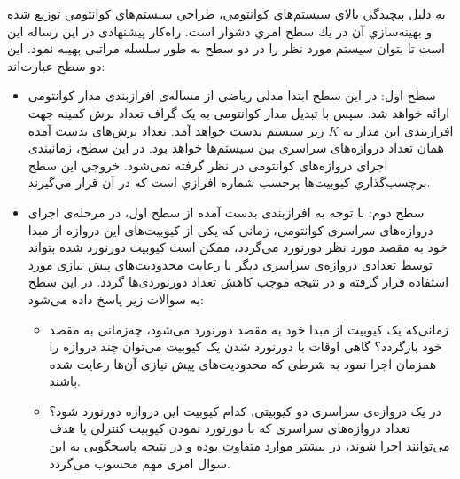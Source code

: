 به دليل پيچيدگي بالاي سيستم‌هاي كوانتومي، طراحي سيستم‌هاي كوانتومي توزيع شده و بهينه‌سازي آن در يك سطح امري دشوار است. راه‌کار پیشنهادی در این رساله این است تا بتوان سیستم مورد نظر را در دو سطح به طور سلسله مراتبی بهینه نمود. این دو سطح عبارت‌اند:
\begin{itemize}
\item

 سطح اول: در این سطح ابتدا مدلی ریاضی از مساله‌ی افرازبندی مدار کوانتومی ارائه خواهد شد. سپس با تبدیل مدار کوانتومی به یک گراف تعداد برش کمینه جهت افرازبندی این مدار به $K$ زیر سیستم بدست خواهد آمد. تعداد برش‌های بدست آمده همان تعداد دروازه‌های سراسری بین سیستم‌ها خواهد بود. در این سطح، زمانبندی اجرای دروازه‌های کوانتومی در نظر گرفته نمی‌شود. خروجي اين سطح برچسب‌گذاري كيوبيت‌ها برحسب شماره افرازي است كه در آن قرار مي‌گيرند.


\item
 سطح دوم: با توجه به افرازبندی بدست آمده از سطح اول، در مرحله‌ی اجرای دروازه‌های سراسری کوانتومی، زمانی که یکی از کیوبیت‌های این دروازه از مبدا خود به مقصد مورد نظر دورنورد می‌گردد، ممکن است کیوبیت دورنورد شده بتواند توسط تعدادی دروازه‌ی سراسری دیگر با رعایت محدودیت‌های پیش نیازی مورد استفاده قرار گرفته و در نتیجه موجب کاهش تعداد دورنوردی‌ها گردد. در این سطح به سوالات زیر پاسخ داده می‌شود: 
\begin{itemize}
\item
زمانی‌که یک کیوبیت از مبدا خود به مقصد دورنورد می‌شود، چه‌زمانی به مقصد خود بازگردد؟ گاهی اوقات با دورنورد شدن یک کیوبیت می‌توان چند دروازه را همزمان اجرا نمود به شرطی که محدودیت‌های پیش نیازی آن‌ها رعایت شده باشند.
\item
در یک دروازه‌ی سراسری دو کیوبیتی، کدام کیوبیت این دروازه دورنورد شود؟  تعداد دروازه‌های سراسری که با دورنورد نمودن کیوبیت کنترلی یا هدف می‌توانند اجرا شوند، در بیشتر موارد متفاوت بوده و در نتیجه پاسخگویی به این سوال امری مهم محسوب می‌گردد.
\end{itemize}
\end{itemize}


